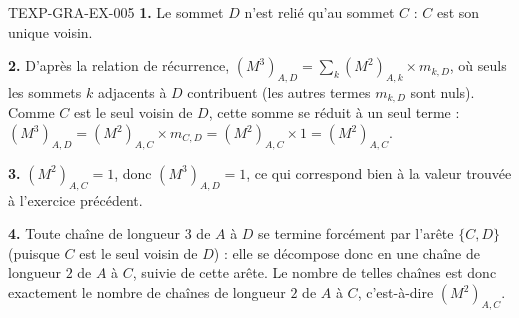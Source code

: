 \begin{corrige}{TEXP-GRA-EX-005}
\textbf{1.} Le sommet $D$ n'est relié qu'au sommet $C$ : $C$ est son unique voisin.

\textbf{2.} D'après la relation de récurrence, $(M^3)_{A,D}=\displaystyle\sum_{k}(M^2)_{A,k}\times m_{k,D}$, où seuls les sommets $k$ adjacents à $D$ contribuent (les autres termes $m_{k,D}$ sont nuls). Comme $C$ est le seul voisin de $D$, cette somme se réduit à un seul terme : $(M^3)_{A,D}=(M^2)_{A,C}\times m_{C,D}=(M^2)_{A,C}\times1=(M^2)_{A,C}$.

\textbf{3.} $(M^2)_{A,C}=1$, donc $(M^3)_{A,D}=1$, ce qui correspond bien à la valeur trouvée à l'exercice précédent.

\textbf{4.} Toute chaîne de longueur $3$ de $A$ à $D$ se termine forcément par l'arête $\{C,D\}$ (puisque $C$ est le seul voisin de $D$) : elle se décompose donc en une chaîne de longueur $2$ de $A$ à $C$, suivie de cette arête. Le nombre de telles chaînes est donc exactement le nombre de chaînes de longueur $2$ de $A$ à $C$, c'est-à-dire $(M^2)_{A,C}$.
\end{corrige}

